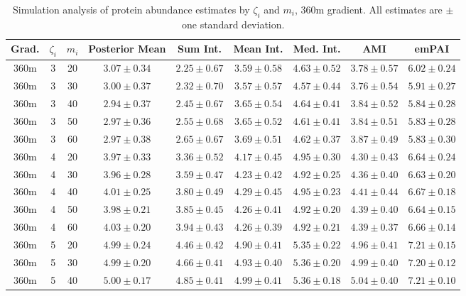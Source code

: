 \begin{table}
\begin{center}
\caption{Simulation analysis of protein abundance estimates by $\zeta_i$ and $m_i$, 360m gradient. All estimates are $\pm$ one standard deviation. \label{tab:sim_estimates_360m}}
\begin{tabular}{ccc|c|ccccc}
 Grad. & $\zeta_i$ & $m_i$ & Posterior Mean & Sum Int. & Mean Int. & Med. Int. & AMI & emPAI \\ 
 \hline
360m &   3 &  20 & $3.07 \pm 0.34$ & $2.25 \pm 0.67$ & $3.59 \pm 0.58$ & $4.63 \pm 0.52$ & $3.78 \pm 0.57$ & $6.02 \pm 0.24$ \\ 
  360m &   3 &  30 & $3.00 \pm 0.37$ & $2.32 \pm 0.70$ & $3.57 \pm 0.57$ & $4.57 \pm 0.44$ & $3.76 \pm 0.54$ & $5.91 \pm 0.27$ \\ 
  360m &   3 &  40 & $2.94 \pm 0.37$ & $2.45 \pm 0.67$ & $3.65 \pm 0.54$ & $4.64 \pm 0.41$ & $3.84 \pm 0.52$ & $5.84 \pm 0.28$ \\ 
  360m &   3 &  50 & $2.97 \pm 0.36$ & $2.55 \pm 0.68$ & $3.65 \pm 0.52$ & $4.61 \pm 0.41$ & $3.84 \pm 0.51$ & $5.83 \pm 0.28$ \\ 
  360m &   3 &  60 & $2.97 \pm 0.38$ & $2.65 \pm 0.67$ & $3.69 \pm 0.51$ & $4.62 \pm 0.37$ & $3.87 \pm 0.49$ & $5.83 \pm 0.30$ \\ 
   \hline
360m &   4 &  20 & $3.97 \pm 0.33$ & $3.36 \pm 0.52$ & $4.17 \pm 0.45$ & $4.95 \pm 0.30$ & $4.30 \pm 0.43$ & $6.64 \pm 0.24$ \\ 
  360m &   4 &  30 & $3.96 \pm 0.28$ & $3.59 \pm 0.47$ & $4.23 \pm 0.42$ & $4.92 \pm 0.25$ & $4.36 \pm 0.40$ & $6.63 \pm 0.20$ \\ 
  360m &   4 &  40 & $4.01 \pm 0.25$ & $3.80 \pm 0.49$ & $4.29 \pm 0.45$ & $4.95 \pm 0.23$ & $4.41 \pm 0.44$ & $6.67 \pm 0.18$ \\ 
  360m &   4 &  50 & $3.98 \pm 0.21$ & $3.85 \pm 0.45$ & $4.26 \pm 0.41$ & $4.92 \pm 0.20$ & $4.39 \pm 0.40$ & $6.64 \pm 0.15$ \\ 
  360m &   4 &  60 & $4.03 \pm 0.20$ & $3.94 \pm 0.43$ & $4.26 \pm 0.39$ & $4.92 \pm 0.21$ & $4.39 \pm 0.37$ & $6.66 \pm 0.14$ \\ 
   \hline
360m &   5 &  20 & $4.99 \pm 0.24$ & $4.46 \pm 0.42$ & $4.90 \pm 0.41$ & $5.35 \pm 0.22$ & $4.96 \pm 0.41$ & $7.21 \pm 0.15$ \\ 
  360m &   5 &  30 & $4.99 \pm 0.20$ & $4.66 \pm 0.41$ & $4.93 \pm 0.40$ & $5.36 \pm 0.20$ & $4.99 \pm 0.40$ & $7.20 \pm 0.12$ \\ 
  360m &   5 &  40 & $5.00 \pm 0.17$ & $4.85 \pm 0.41$ & $4.99 \pm 0.41$ & $5.36 \pm 0.18$ & $5.04 \pm 0.40$ & $7.21 \pm 0.10$ \\ 

\end{tabular}
\end{center}
\end{table}
